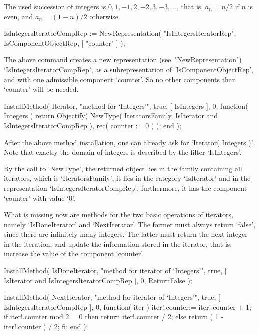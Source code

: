 The used succession of integers is $0, 1, -1, 2, -2, 3, -3, \ldots$,
that is, $a_n = n/2$ if $n$ is even,
and $a_n = (1-n)/2$ otherwise.

\begintt
IsIntegersIteratorCompRep := NewRepresentation( "IsIntegersIteratorRep",
    IsComponentObjectRep, [ "counter" ] );
\endtt

The above command creates a new representation (see~"NewRepresentation")
`IsIntegersIteratorCompRep',
as a subrepresentation of `IsComponentObjectRep',
and with one admissible component `counter'.
So no other components than `counter' will be needed.

\begintt
InstallMethod( Iterator,
    "method for `Integers'",
    true,
    [ IsIntegers ], 0,
    function( Integers )
    return Objectify( NewType( IteratorsFamily,
                                   IsIterator
                               and IsIntegersIteratorCompRep ),
                      rec( counter := 0 ) );
    end );
\endtt

After the above method installation, one can already ask for
`Iterator( Integers )'.
Note that exactly the domain of integers is described by
the filter `IsIntegers'.

By the call to `NewType', the returned object lies in the family
containing all iterators, which is `IteratorsFamily', 
it lies in the category `IsIterator' and in the representation
`IsIntegersIteratorCompRep';
furthermore, it has the component `counter' with value `0'.

What is missing now are methods for the two basic operations
of iterators, namely `IsDoneIterator' and `NextIterator'.
The former must always return `false', since there are infinitely
many integers.
The latter must return the next integer in the iteration,
and update the information stored in the iterator,
that is, increase the value of the component `counter'.

\begintt
InstallMethod( IsDoneIterator,
    "method for iterator of `Integers'",
    true,
    [ IsIterator and IsIntegersIteratorCompRep ], 0,
    ReturnFalse );

InstallMethod( NextIterator,
    "method for iterator of `Integers'",
    true,
    [ IsIntegersIteratorCompRep ], 0,
    function( iter )
    iter!.counter:= iter!.counter + 1;
    if iter!.counter mod 2 = 0 then
      return iter!.counter / 2;
    else
      return ( 1 - iter!.counter ) / 2;
    fi;
    end );
\endtt


